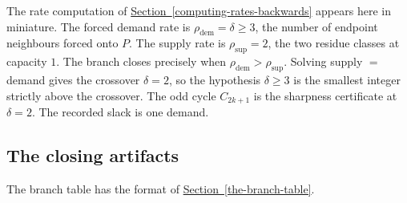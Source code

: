 \documentclass[
  11pt,
]{article}
\theoremstyle{definition}
\newcommand{\secref}[1]{\hyperref[#1]{Section~\ref*{#1}}}
\begin{document}
The rate computation of \secref{computing-rates-backwards} appears here in miniature. The
forced demand rate is \(\rho_{\mathrm{dem}}=\delta\ge3\), the number of
endpoint neighbours forced onto \(P\). The supply rate is
\(\rho_{\mathrm{sup}}=2\), the two residue classes at capacity \(1\).
The branch closes precisely when
\(\rho_{\mathrm{dem}}>\rho_{\mathrm{sup}}\). Solving supply \(=\) demand
gives the crossover \(\delta=2\), so the hypothesis \(\delta\ge3\) is
the smallest integer strictly above the crossover. The odd cycle
\(C_{2k+1}\) is the sharpness certificate at \(\delta=2\). The recorded
slack is one demand.

\subsection{The closing
artifacts}\label{c.7-the-closing-artifacts}

The branch table has the format of \secref{the-branch-table}.
\end{document}
